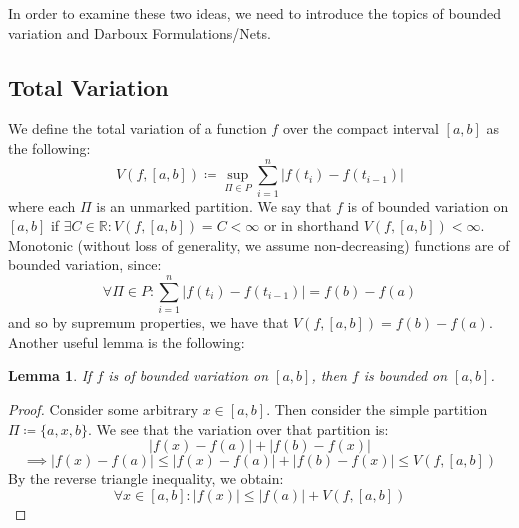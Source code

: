 \documentclass[10pt,letterpaper]{article} %
\newtheorem{lem}{Lemma}[section]
\begin{document}
In order to examine these two ideas, we need to introduce the topics of bounded variation and Darboux Formulations/Nets.

\subsection{Total Variation}
We define the total variation of a function $f$ over the compact interval $[a, b]$ as the following:
\begin{equation*}
V(f, [a, b]) \coloneq \sup_{\Pi \in P}\sum_{i=1}^{n}|f(t_i) - f(t_{i-1})|
\end{equation*}
where each $\Pi$ is an unmarked partition. We say that $f$ is of bounded variation on $[a, b]$ if $\exists C \in \mathbb{R}: V(f, [a, b]) = C < \infty$ or in shorthand $V(f, [a, b]) < \infty$.\\

Monotonic (without loss of generality, we assume non-decreasing) functions are of bounded variation, since:
\begin{equation*}
\forall \Pi \in P: \sum_{i=1}^{n}|f(t_i) - f(t_{i-1})| = f(b) - f(a)
\end{equation*}
and so by supremum properties, we have that $V(f, [a, b]) = f(b) - f(a)$. Another useful lemma is the following:


\begin{lem}
If $f$ is of bounded variation on $[a, b]$, then $f$ is bounded on $[a, b]$.
\end{lem}
\begin{proof}
Consider some arbitrary $x \in [a, b]$. Then consider the simple partition $\Pi \coloneq \{a, x, b\}$. We see that the variation over that partition is:
\begin{equation*}
|f(x) - f(a)| + |f(b) - f(x)|
\end{equation*}
\begin{equation*}
\implies |f(x) - f(a)| \leqslant |f(x) - f(a)| + |f(b) - f(x)| \leqslant V(f, [a, b])
\end{equation*}
By the reverse triangle inequality, we obtain:
\begin{equation*}
\forall x \in [a, b]: |f(x)| \leqslant |f(a)| + V(f, [a, b]) 
\end{equation*}
\end{proof}
\end{document}
